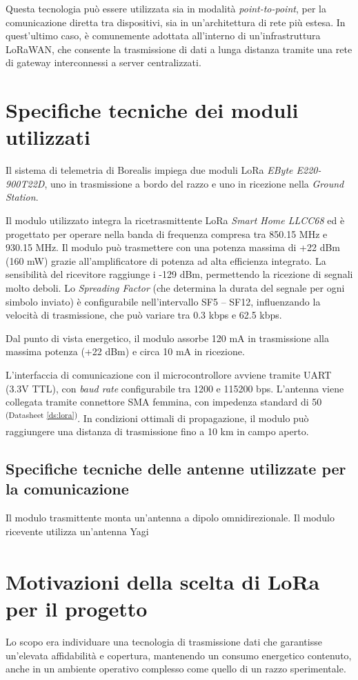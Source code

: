\documentclass[12pt,a4paper,twoside]{book}
\newcommand{\dsref}[1]{\textsuperscript{(Datasheet \ref{#1})}}
\begin{document}
Questa tecnologia può essere utilizzata sia in modalità \emph{point-to-point},
per la comunicazione diretta tra dispositivi, sia in un’architettura di rete più
estesa. In quest'ultimo caso, è comunemente adottata all'interno di
un'infrastruttura \ac{LoRaWAN}, che consente la trasmissione di dati a lunga
distanza tramite una rete di gateway interconnessi a server centralizzati.

\section{Specifiche tecniche dei moduli utilizzati}
Il sistema di telemetria di Borealis impiega due moduli \ac{LoRa} 
\emph{EByte E220-900T22D}, uno in trasmissione a bordo del razzo e uno in 
ricezione nella \emph{Ground Station}.

Il modulo utilizzato integra la ricetrasmittente \ac{LoRa}
\emph{Smart Home LLCC68} ed è progettato per operare nella banda
di frequenza compresa tra 850.15 MHz e 930.15 MHz.
Il modulo può trasmettere con una potenza massima di +22 dBm (160 mW) grazie 
all'amplificatore di potenza ad alta efficienza integrato. 
La sensibilità del ricevitore raggiunge i -129 dBm, permettendo la ricezione di 
segnali molto deboli. 
Lo \emph{Spreading Factor} (che determina la durata del segnale per ogni simbolo
inviato) è configurabile nell’intervallo SF5 – SF12, influenzando la velocità di 
trasmissione, che può variare tra 0.3 kbps e 62.5 kbps.

Dal punto di vista energetico, il modulo assorbe 120 mA in trasmissione alla 
massima potenza (+22 dBm) e circa 10 mA in ricezione.

L'interfaccia di comunicazione con il microcontrollore avviene tramite \ac{UART} 
(3.3V TTL), con \emph{baud rate} configurabile tra 1200 e 115200 bps. 
L'antenna viene collegata tramite connettore SMA femmina, con impedenza standard 
di 50 \textohm\dsref{ds:lora}.
In condizioni ottimali di propagazione, il modulo può raggiungere una distanza 
di trasmissione fino a 10 km in campo aperto.

\subsection{Specifiche tecniche delle antenne utilizzate per la comunicazione}
Il modulo trasmittente monta un'antenna a dipolo omnidirezionale.
Il modulo ricevente utilizza un'antenna Yagi 

\section{Motivazioni della scelta di \texorpdfstring{LoRa\textsuperscript{\textcopyright}}{} per il progetto}
Lo scopo era individuare una tecnologia di trasmissione dati che garantisse 
un'elevata affidabilità e copertura, mantenendo un consumo energetico contenuto,
anche in un ambiente operativo complesso come quello di un razzo sperimentale.
\end{document}
